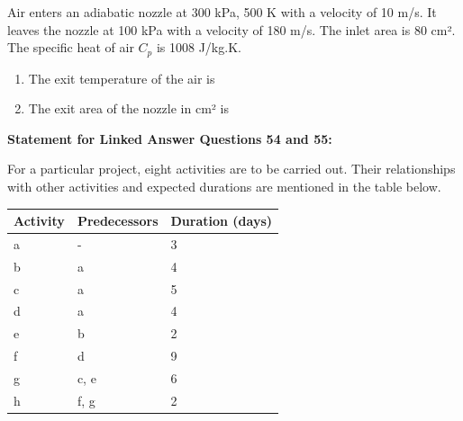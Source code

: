 \documentclass[journal,11pt,onecolumn]{IEEEtran}
\begin{document}
Air enters an adiabatic nozzle at 300 kPa, 500 K with a velocity of 10 m/s. It leaves the nozzle at 100 kPa with a velocity of 180 m/s. The inlet area is 80 cm². The specific heat of air \(C_p\) is 1008 J/kg.K.

\begin{enumerate}[resume]

    \item The exit temperature of the air is

          \begin{enumerate}
          \end{enumerate}

    \item The exit area of the nozzle in cm² is

          \begin{enumerate}
          \end{enumerate}

\end{enumerate}

\normalsize\textbf{Statement for Linked Answer Questions 54 and 55:}

For a particular project, eight activities are to be carried out. Their relationships with other activities and expected durations are mentioned in the table below.

\begin{table}[H]
    \centering
    \begin{tabular}{|l|l|l|}
        \hline
        Activity & Predecessors & Duration (days) \\
        \hline
        a        & -            & 3               \\
        b        & a            & 4               \\
        c        & a            & 5               \\
        d        & a            & 4               \\
        e        & b            & 2               \\
        f        & d            & 9               \\
        g        & c, e         & 6               \\
        h        & f, g         & 2               \\
        \hline
    \end{tabular}
\end{table}
\end{document}
